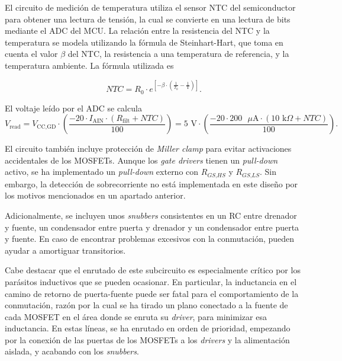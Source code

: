 El circuito de medición de temperatura utiliza el sensor NTC del semiconductor para obtener una lectura de tensión, la cual se convierte en una lectura de bits mediante el ADC del MCU. La relación entre la resistencia del NTC y la temperatura se modela utilizando la fórmula de Steinhart-Hart, que toma en cuenta el valor $\beta$ del NTC, la resistencia a una temperatura de referencia, y la temperatura ambiente. La fórmula utilizada es

\[
NTC = R_0 \cdot e^{\left[-\beta \cdot \left(\frac{1}{T_0} - \frac{1}{\text{T}}\right)\right]} \text{.}
\]

El voltaje leído por el ADC se calcula
\[
V_{\text{read}} = V_{\text{CC,GD}} \cdot \left(\frac{-20 \cdot I_{\text{AIN}} \cdot (R_{\text{filt}} + NTC)}{100}\right) = 5 \text{ V} \cdot \left(\frac{-20 \cdot 200 \text{ }\mu\text{A} \cdot (10 \text{ k}\Omega + NTC)}{100}\right) \text{.}
\]

El circuito también incluye protección de \textit{Miller clamp} para evitar activaciones accidentales de los MOSFETs. Aunque los \textit{gate drivers} tienen un \textit{pull-down} activo, se ha implementado un \textit{pull-down} externo con $R_{\textit{GS,HS}}$ y $R_{\textit{GS,LS}}$. Sin embargo, la detección de sobrecorriente no está implementada en este diseño por los motivos mencionados en un apartado anterior.

Adicionalmente, se incluyen unos \textit{snubbers} consistentes en un RC entre drenador y fuente, un condensador entre puerta y drenador y un condensador entre puerta y fuente. En caso de encontrar problemas excesivos con la conmutación, pueden ayudar a amortiguar transitorios.

Cabe destacar que el enrutado de este subcircuito es especialmente crítico por los parásitos inductivos que se pueden ocasionar. En particular, la inductancia en el camino de retorno de puerta-fuente puede ser fatal para el comportamiento de la conmutación, razón por la cual se ha tirado un plano conectado a la fuente de cada MOSFET en el área donde se enruta su \textit{driver}, para minimizar esa inductancia. En estas líneas, se ha enrutado en orden de prioridad, empezando por la conexión de las puertas de los MOSFETs a los \textit{drivers} y la alimentación aislada, y acabando con los \textit{snubbers}.

